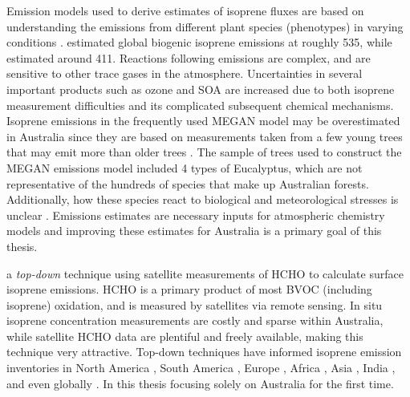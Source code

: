   
  Emission models used to derive estimates of isoprene fluxes are based on understanding the emissions from different plant species (phenotypes) in varying conditions .
  \textcite{Guenther2012} estimated global biogenic isoprene emissions at roughly 535\tgpyr, while \textcite{Sindelarova2014} estimated around 411\tgpyr.
  Reactions following emissions are complex, and are sensitive to other trace gases in the atmosphere.
  Uncertainties in several important products such as ozone and SOA are increased due to both isoprene measurement difficulties and its complicated subsequent chemical mechanisms.
  Isoprene emissions in the frequently used MEGAN model may be overestimated in Australia since they are based on measurements taken from a few young trees \parencite{Winters2009} that may emit more than older trees \parencite{Emmerson2016}.
  The sample of trees used to construct the MEGAN emissions model included 4 types of Eucalyptus, which are not representative of the hundreds of species that make up Australian forests.
  Additionally, how these species react to biological and meteorological stresses is unclear \parencite{Winters2009, FortemsCheiney2012}.
  Emissions estimates are necessary inputs for atmospheric chemistry models and improving these estimates for Australia is a primary goal of this thesis.
  
  
   a \textit{top-down} technique using satellite measurements of HCHO to calculate surface isoprene emissions.
  HCHO is a primary product of most BVOC (including isoprene) oxidation, and is measured by satellites via remote sensing.
  In situ isoprene concentration measurements are costly and sparse within Australia, while satellite HCHO data are plentiful and freely available, making this technique very attractive.
  Top-down techniques have informed isoprene emission inventories in North America \parencite{Abbot2003,Palmer2003,Palmer2006,Millet2006,Millet2008}, South America \parencite{Barkley2013}, Europe \parencite{Dufour2009,Curci2010}, Africa \parencite{Marais2012}, Asia \parencite{Fu2007,Stavrakou2014}, India \parencite{Surl2018}, and even globally \parencite{Shim2005,FortemsCheiney2012,Bauwens2016}.
  In this thesis  focusing solely on Australia for the first time.
  
